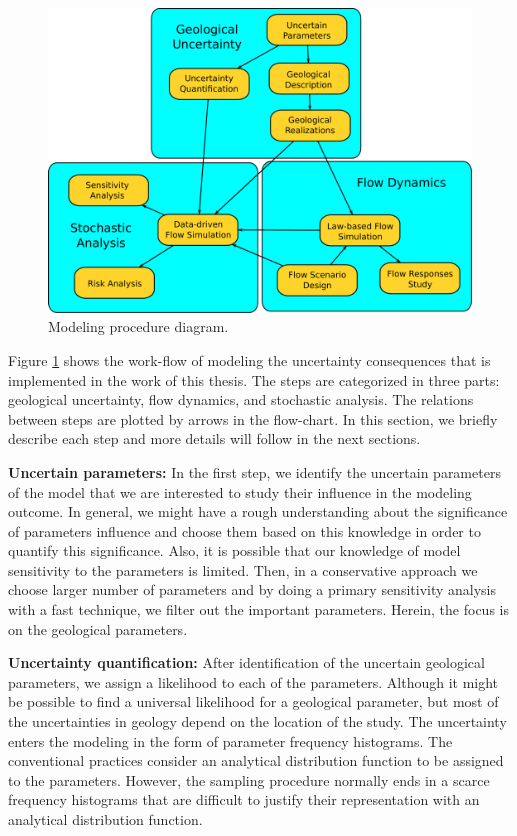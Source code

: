 \begin{figure}
  \centering
  \includegraphics[width=0.95 \linewidth]{./figurer/prc2} 
  
  \caption{Modeling procedure diagram.}
  \label{fig:prc}
%
\end{figure}

Figure \ref{fig:prc} shows the work-flow of modeling the uncertainty consequences that is implemented in the work of this thesis. The steps are categorized in three parts: geological uncertainty, flow dynamics, and stochastic analysis. The relations between steps are plotted by arrows in the flow-chart. In this section, we briefly describe each step and more details will follow in the next sections.

\textbf{Uncertain parameters:} In the first step, we identify the uncertain parameters of the model that we are interested to study their influence in the modeling outcome. In general, we might have a rough understanding about the significance of parameters influence and choose them based on this knowledge in order to quantify this significance. Also, it is possible that our knowledge of model sensitivity to the parameters is limited. Then, in a conservative approach we choose larger number of parameters and by doing a primary sensitivity analysis with a fast technique, we filter out the important parameters. Herein, the focus is on the geological parameters.

\textbf{Uncertainty quantification:} After identification of the uncertain geological parameters, we assign a likelihood to each of the parameters. Although it might be possible to find a universal likelihood for a geological parameter, but most of the uncertainties in geology depend on the location of the study. The uncertainty enters the modeling in the form of parameter frequency histograms. The conventional practices consider an analytical distribution function to be assigned to the parameters. However, the sampling procedure normally ends in a scarce frequency histograms that are difficult to justify their representation with an analytical distribution function.

